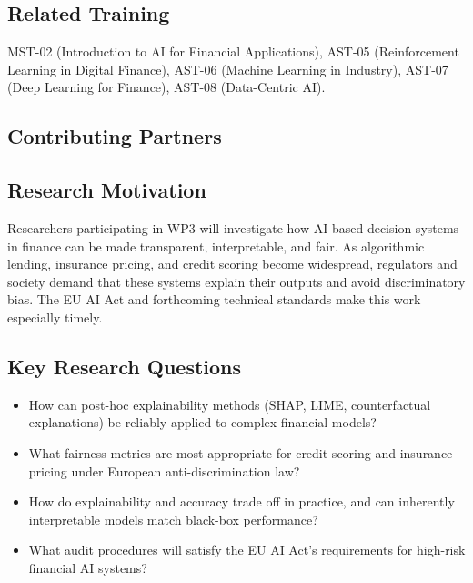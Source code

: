 \subsection*{Related Training}
MST-02 (Introduction to AI for Financial Applications),
AST-05 (Reinforcement Learning in Digital Finance),
AST-06 (Machine Learning in Industry), AST-07 (Deep Learning for Finance),
AST-08 (Data-Centric AI).

\subsection*{Contributing Partners}
\begin{center}
\hspace{3mm}%
\hspace{3mm}%
\end{center}

\newpage


\subsection*{Research Motivation}

Researchers participating in WP3 will investigate how AI-based decision systems
in finance can be made transparent, interpretable, and fair.  As algorithmic
lending, insurance pricing, and credit scoring become widespread, regulators and
society demand that these systems explain their outputs and avoid
discriminatory bias.  The EU AI Act and forthcoming technical standards make this
work especially timely.

\subsection*{Key Research Questions}
\begin{itemize}[nosep]
  \item How can post-hoc explainability methods (SHAP, LIME, counterfactual
        explanations) be reliably applied to complex financial models?
  \item What fairness metrics are most appropriate for credit scoring and
        insurance pricing under European anti-discrimination law?
  \item How do explainability and accuracy trade off in practice, and can
        inherently interpretable models match black-box performance?
  \item What audit procedures will satisfy the EU AI Act's requirements for
        high-risk financial AI systems?
\end{itemize}

